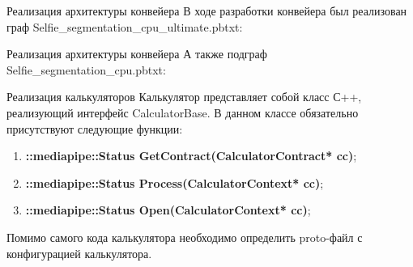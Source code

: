 \documentclass[aspectratio=169,xcolor=dvipsnames]{beamer}
\begin{document}
\begin{frame}{Реализация архитектуры конвейера}
    В ходе разработки конвейера был реализован граф Selfie\_segmentation\_cpu\_ultimate.pbtxt:
    \begin{figure}[h]
        \label{ris:subgraph}
    \end{figure}
\end{frame}

\begin{frame}{Реализация архитектуры конвейера}
    А также подграф Selfie\_segmentation\_cpu.pbtxt:
    \begin{figure}[h]
        \label{ris:subgraph}
    \end{figure}
\end{frame}


\begin{frame}{Реализация калькуляторов}
    Калькулятор представляет собой класс С++, реализующий интерфейс CalculatorBase. В данном классе обязательно присутствуют следующие функции:
    \begin{enumerate}
        \item \textbf{::mediapipe::Status GetContract(CalculatorContract* cc)};
        \item \textbf{::mediapipe::Status Process(CalculatorContext* cc)};
        \item \textbf{::mediapipe::Status Open(CalculatorContext* cc)};
    \end{enumerate}
    
    Помимо самого кода калькулятора необходимо определить proto-файл с конфигурацией калькулятора.
\end{frame}
\end{document}
